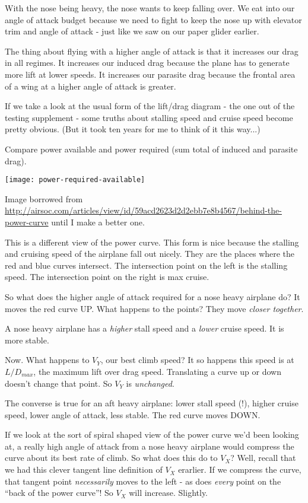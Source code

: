 With the nose being heavy, the nose wants to keep falling over. We eat into our angle of attack budget because we need to fight to keep the nose up with elevator trim and angle of attack - just like we saw on our paper glider earlier.

The thing about flying with a higher angle of attack is that it increases our drag in all regimes. It increases our induced drag because the plane has to generate more lift at lower speeds. It increases our parasite drag because the frontal area of a wing at a higher angle of attack is greater.

If we take a look at the usual form of the lift/drag diagram - the one out of the testing supplement - some truths about stalling speed and cruise speed become pretty obvious. (But it took ten years for me to think of it this way...)

Compare power available and power required (sum total of induced and parasite drag).

\texttt{[image: power-required-available]}

Image borrowed from \url{http://airsoc.com/articles/view/id/59acd2623d2d2ebb7e8b4567/behind-the-power-curve} until I make a better one.

This is a different view of the power curve. This form is nice because the stalling and cruising speed of the airplane fall out nicely. They are the places where the red and blue curves intersect. The intersection point on the left is the stalling speed. The intersection point on the right is max cruise.

So what does the higher angle of attack required for a nose heavy airplane do? It moves the red curve UP. What happens to the points? They move \emph{closer together}.

A nose heavy airplane has a \emph{higher} stall speed and a \emph{lower} cruise speed. It is more stable.

Now. What happens to $V_Y$, our best climb speed? It so happens this speed is at $L/D_{max}$, the maximum lift over drag speed. Translating a curve up or down doesn't change that point. So $V_Y$ is \emph{unchanged}.

The converse is true for an aft heavy airplane: lower stall speed (!), higher cruise speed, lower angle of attack, less stable. The red curve moves DOWN.

If we look at the sort of spiral shaped view of the power curve we'd been looking at, a really high angle of attack from a nose heavy airplane would compress the curve about its best rate of climb. So what does this do to $V_X$? Well, recall that we had this clever tangent line definition of $V_X$ erarlier. If we compress the curve, that tangent point \emph{necessarily} moves to the left - as does \emph{every} point on the ``back of the power curve''! So $V_X$ will increase. Slightly.



